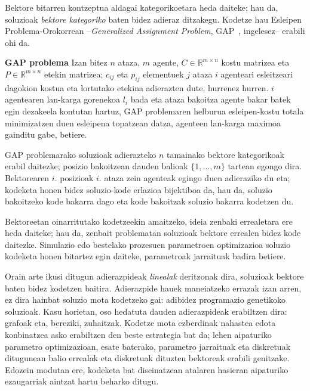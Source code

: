 \documentclass[eu]{ifirak}\usepackage[]{graphicx}\usepackage[]{color}
\begin{document}
Bektore bitarren kontzeptua aldagai kategorikoetara heda daiteke; hau da, soluzioak \textit{bektore kategoriko} baten bidez adieraz ditzakegu. Kodetze hau Esleipen Problema-Orokorrean --\textit{Generalized Assignment Problem}, GAP~\cite{shmoys1993}, ingelesez-- erabili ohi da.

\begin{tcolorbox}
\begin{ifdefinition}{\bf GAP problema}
Izan bitez $n$ ataza, $m$ agente, $C\in \mathbb{R}^{m\times n}$ kostu matrizea eta $P\in \mathbb{R}^{m\times n}$ etekin matrizea; $c_{ij}$ eta $p_{ij}$ elementuek $j$ ataza $i$ agenteari esleitzeari dagokion kostua eta lortutako etekina adierazten dute, hurrenez hurren. $i$ agentearen lan-karga gorenekoa $l_i$ bada eta ataza bakoitza agente bakar batek egin dezakeela kontutan hartuz, GAP problemaren helburua esleipen-kostu totala minimizatzen duen esleipena topatzean datza, agenteen lan-karga maximoa gainditu gabe, betiere.
\end{ifdefinition}
\end{tcolorbox}

GAP problemarako soluzioak adierazteko $n$ tamainako bektore kategorikoak erabil daitezke; posizio bakoitzean dauden balioak $\{1,\ldots,m\}$ tartean egongo dira. Bektorearen $i$. posizioak $i$. ataza zein agenteak egingo duen adieraziko du eta; kodeketa honen bidez soluzio-kode erlazioa bijektiboa da, hau da, soluzio bakoitzeko kode bakarra dago eta kode bakoitzak soluzio bakarra kodetzen du.

Bektoreetan oinarritutako kodetzeekin amaitzeko, ideia zenbaki errealetara ere heda daiteke; hau da, zenbait problematan soluzioak bektore errealen bidez kode daitezke. Simulazio edo bestelako prozesuen parametroen optimizazioa soluzio kodeketa honen bitartez egin daiteke, parametroak jarraituak badira betiere.

Orain arte ikusi ditugun adierazpideak \textit{linealak} deritzonak dira, soluzioak bektore baten bidez kodetzen baitira. Adierazpide hauek maneiatzeko errazak izan arren, ez dira hainbat soluzio mota kodetzeko gai: adibidez programazio genetikoko soluzioak. Kasu horietan, oso hedatuta dauden adierazpideak erabiltzen dira: grafoak eta, bereziki, zuhaitzak. Kodetze mota ezberdinak nahastea edota konbinatzea asko erabiltzen den beste estrategia bat da; lehen aipaturiko parametro optimizazioan, esate baterako, parametro jarraituak eta diskretuak ditugunean balio errealak eta diskretuak dituzten bektoreak erabili genitzake. Edozein modutan ere, kodeketa bat diseinatzean atalaren hasieran aipaturiko ezaugarriak aintzat hartu beharko ditugu.
\end{document}
